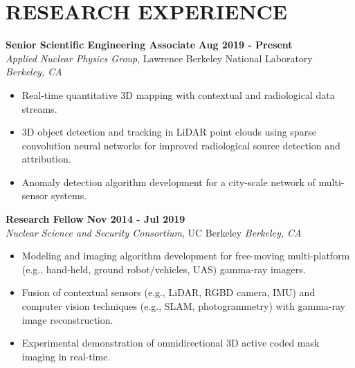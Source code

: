\section{\small{RESEARCH EXPERIENCE}}

\textbf{Senior Scientific Engineering Associate} \hfill \textbf{Aug 2019 - Present} \\
\textsl{Applied Nuclear Physics Group}, Lawrence Berkeley National Laboratory \hfill \textsl{Berkeley, CA} \\[-2.8ex]
\begin{itemize}[leftmargin=4ex] \itemsep -2pt
    \item Real-time quantitative 3D mapping with contextual and radiological data streams.
    \item 3D object detection and tracking in LiDAR point clouds using sparse convolution neural networks for improved radiological source detection and attribution.
    \item Anomaly detection algorithm development for a city-scale network of multi-sensor systems.
\end{itemize}
\vspace{-5pt}

\textbf{Research Fellow} \hfill \textbf{Nov 2014 - Jul 2019} \\
\textsl{Nuclear Science and Security Consortium}, UC Berkeley \hfill \textsl{Berkeley, CA} \\[-2.8ex]
\begin{itemize}[leftmargin=4ex] \itemsep -2pt
    \item Modeling and imaging algorithm development for free-moving multi-platform (e.g., hand-held, ground robot/vehicles, UAS) gamma-ray imagers.
    \item Fusion of contextual sensors (e.g., LiDAR, RGBD camera, IMU) and computer vision techniques (e.g., SLAM, photogrammetry) with gamma-ray image reconstruction.
    \item Experimental demonstration of omnidirectional 3D active coded mask imaging in real-time.
\end{itemize}
\vspace{-5pt}

